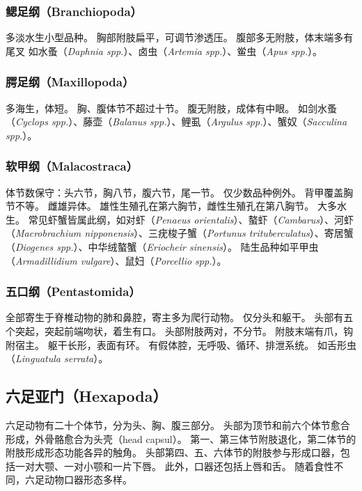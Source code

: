 \documentclass[11pt]{article}
\begin{document}
\subsubsection{鳃足纲（Branchiopoda）}
多淡水生小型品种。
胸部附肢扁平，可调节渗透压。
腹部多无附肢，体末端多有尾叉
如水蚤（\textit{Daphnia spp.}）、卤虫（\textit{Artemia spp.}）、鲎虫（\textit{Apus spp.}）。

\subsubsection{腭足纲（Maxillopoda）}
多海生，体短。
胸、腹体节不超过十节。
腹无附肢，成体有中眼。
如剑水蚤（\textit{Cyclops spp.}）、藤壶（\textit{Balanus spp.}）、鲤虱（\textit{Argulus spp.}）、蟹奴（\textit{Sacculina spp.}）。

\subsubsection{软甲纲（Malacostraca）}
体节数保守：头六节，胸八节，腹六节，尾一节。
仅少数品种例外。
背甲覆盖胸节不等。
雌雄异体。
雄性生殖孔在第六胸节，雌性生殖孔在第八胸节。
大多水生。
常见虾蟹皆属此纲，如对虾（\textit{Penaeus orientalis}）、螯虾（\textit{Cambarus}）、河虾（\textit{Macrobrachium nipponensis}）、三疣梭子蟹（\textit{Portunus trituberculatus}）、寄居蟹（\textit{Diogenes spp.}）、中华绒螯蟹（\textit{Eriocheir sinensis}）。
陆生品种如平甲虫（\textit{Armadillidium vulgare}）、鼠妇（\textit{Porcellio spp.}）。

\subsubsection{五口纲（Pentastomida）}
全部寄生于脊椎动物的肺和鼻腔，寄主多为爬行动物。
仅分头和躯干。
头部有五个突起，突起前端吻状，着生有口。
头部附肢两对，不分节。
附肢末端有爪，钩附宿主。
躯干长形，表面有环。
有假体腔，无呼吸、循环、排泄系统。
如舌形虫（\textit{Linguatula serrata}）。

\subsection{六足亚门（Hexapoda）}
六足动物有二十个体节，分为头、胸、腹三部分。
头部为顶节和前六个体节愈合形成，外骨骼愈合为头壳（head capsul）。
第一、第三体节附肢退化，第二体节的附肢形成形态功能各异的触角。
头部第四、五、六体节的附肢参与形成口器，包括一对大颚、一对小颚和一片下唇。
此外，口器还包括上唇和舌。
随着食性不同，六足动物口器形态多样。
\end{document}
